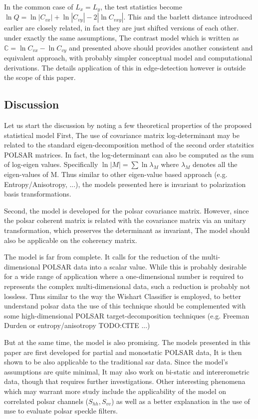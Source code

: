 \documentclass[journal]{IEEEtran}
\begin{document}
In the common case of $L_x = L_y$, the test statistics become
$\ln Q = \ln |C_{vx}| + \ln |C_{vy}| - 2 |\ln C_{vxy}|$.
This and the barlett distance introduced earlier are closely related, in fact they are just shifted versions of each other.
under exactly the same assumptions, 
The contrast model which is written as $\mathbb{C} = \ln C_{vx} - \ln C_{vy}$ and presented above should provides another consistent and equivalent approach,
  with probably simpler conceptual model and computational derivations. 
The details application of this in edge-detection however is outside the scope of this paper.

\subsection{Discussion}

Let us start the discussion by noting a few theoretical properties of the proposed statistical model
First, The use of covariance matrix log-determinant may be related to the standard eigen-decomposition method of the second order statsitics POLSAR matrices.
In fact, the log-determinant can also be computed as the sum of log-eigen values.
Specifically $\ln{|M|} = \sum \ln{\lambda_M}$ where $\lambda_M$ denotes all the eigen-values of M.
Thus similar to other eigen-value based approach (e.g. Entropy/Anisotropy, ...),
  the models presented here is invariant to polarization basis transformations.

Second, the model is developed for the polsar covariance matrix.
However, since the polsar coherent matrix is related with the covariance matrix via an unitary transformation, which preserves the determinant as invariant,
The model should also be applicable on the coherency matrix.

The model is far from complete.
 It calls for the reduction of the multi-dimensional POLSAR data into a scalar value.
While this is probably desirable for a wide range of application where a one-dimensional number is required to represents the complex multi-dimensional data,
  such a reduction is probably not lossless.
Thus similar to the way the Wishart Classifier is employed, to better understand polsar data
  the use of this technique should be complemented with some high-dimensional POLSAR target-decomposition techniques (e.g. Freeman Durden or entropy/anisotropy TODO:CITE ...)

But at the same time, the model is also promising.
The models presented in this paper are first developed for partial and monostatic POLSAR data,
It is then shown to be also applicable to the traditional sar data.
Since the model's assumptions are quite minimal, It may also work on bi-static and intererometric data,
  though that requires further investigations.
Other interesting phenomena which may warrant more study include the applicability of the model on correlated polsar channels ($S_{hh},S_{vv}$) as well as a better explanation in the use of mse to evaluate polsar speckle filters.
\end{document}
